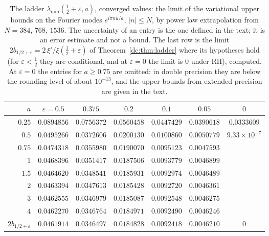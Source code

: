 \begin{table}[ht]
\centering\small
\setlength{\tabcolsep}{4pt}
\begin{tabular}{@{}rcccccc@{}}
\toprule
$a$ & $\varepsilon=0.5$ & $0.375$ & $0.2$ & $0.1$ & $0.05$ & $0$\\
\midrule
$0.25$ & $0.0894856$ & $0.0756372$ & $0.0560458$ & $0.0447429$ & $0.0390618$ & $0.0333609$\\
$0.5$ & $0.0495266$ & $0.0372606$ & $0.0200130$ & $0.0100860$ & $0.0050779$ & $9.33\times10^{-7}$\\
$0.75$ & $0.0474318$ & $0.0355980$ & $0.0190070$ & $0.0095123$ & $0.0047593$ & \\
$1$ & $0.0468396$ & $0.0351417$ & $0.0187506$ & $0.0093779$ & $0.0046899$ & \\
$1.5$ & $0.0464620$ & $0.0348541$ & $0.0185931$ & $0.0092974$ & $0.0046489$ & \\
$2$ & $0.0463394$ & $0.0347613$ & $0.0185428$ & $0.0092720$ & $0.0046361$ & \\
$3$ & $0.0462555$ & $0.0346979$ & $0.0185087$ & $0.0092548$ & $0.0046275$ & \\
$4$ & $0.0462270$ & $0.0346764$ & $0.0184971$ & $0.0092490$ & $0.0046246$ & \\
\midrule
$2b_{1/2+\varepsilon}$ & $0.0461914$ & $0.0346497$ & $0.0184828$ & $0.0092418$ & $0.0046210$ & $0$\\
\bottomrule
\end{tabular}
\caption{The ladder $\lambda_{\min}(\frac12+\varepsilon,a)$, converged values: the limit of the variational upper bounds on the Fourier modes $e^{i\pi nu/a}$, $|n|\le N$, by power law extrapolation from $N=384$, $768$, $1536$. The uncertainty of an entry is the one defined in the text; it is an error estimate and not a bound. The last row is the limit $2b_{1/2+\varepsilon}=2\,\xi'/\xi(\frac12+\varepsilon)$ of Theorem~\ref{dc:thm:ladder} where its hypotheses hold (for $\varepsilon<\frac12$ they are conditional, and at $\varepsilon=0$ the limit is $0$ under RH), computed. At $\varepsilon=0$ the entries for $a\ge0.75$ are omitted: in double precision they are below the rounding level of about $10^{-13}$, and the upper bounds from extended precision are given in the text.}
\label{dc:tab:ladder}
\end{table}


